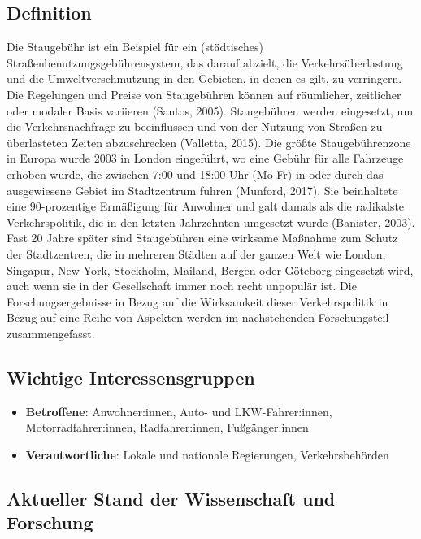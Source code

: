 \documentclass[
]{book}
\providecommand{\tightlist}{%
  \setlength{\itemsep}{0pt}\setlength{\parskip}{0pt}}
\begin{document}
\hypertarget{definition-9}{%
\subsection*{Definition}\label{definition-9}}

Die Staugebühr ist ein Beispiel für ein (städtisches) Straßenbenutzungsgebührensystem, das darauf abzielt, die Verkehrsüberlastung und die Umweltverschmutzung in den Gebieten, in denen es gilt, zu verringern. Die Regelungen und Preise von Staugebühren können auf räumlicher, zeitlicher oder modaler Basis variieren (Santos, 2005). Staugebühren werden eingesetzt, um die Verkehrsnachfrage zu beeinflussen und von der Nutzung von Straßen zu überlasteten Zeiten abzuschrecken (Valletta, 2015). Die größte Staugebührenzone in Europa wurde 2003 in London eingeführt, wo eine Gebühr für alle Fahrzeuge erhoben wurde, die zwischen 7:00 und 18:00 Uhr (Mo-Fr) in oder durch das ausgewiesene Gebiet im Stadtzentrum fuhren (Munford, 2017). Sie beinhaltete eine 90-prozentige Ermäßigung für Anwohner und galt damals als die radikalste Verkehrspolitik, die in den letzten Jahrzehnten umgesetzt wurde (Banister, 2003). Fast 20 Jahre später sind Staugebühren eine wirksame Maßnahme zum Schutz der Stadtzentren, die in mehreren Städten auf der ganzen Welt wie London, Singapur, New York, Stockholm, Mailand, Bergen oder Göteborg eingesetzt wird, auch wenn sie in der Gesellschaft immer noch recht unpopulär ist. Die Forschungsergebnisse in Bezug auf die Wirksamkeit dieser Verkehrspolitik in Bezug auf eine Reihe von Aspekten werden im nachstehenden Forschungsteil zusammengefasst.

\hypertarget{wichtige-interessensgruppen-9}{%
\subsection*{Wichtige Interessensgruppen}\label{wichtige-interessensgruppen-9}}

\begin{itemize}
\tightlist
\item
  \textbf{Betroffene}: Anwohner:innen, Auto- und LKW-Fahrer:innen, Motorradfahrer:innen, Radfahrer:innen, Fußgänger:innen
\item
  \textbf{Verantwortliche}: Lokale und nationale Regierungen, Verkehrsbehörden
\end{itemize}

\hypertarget{aktueller-stand-der-wissenschaft-und-forschung-9}{%
\subsection*{Aktueller Stand der Wissenschaft und Forschung}\label{aktueller-stand-der-wissenschaft-und-forschung-9}}
\end{document}

